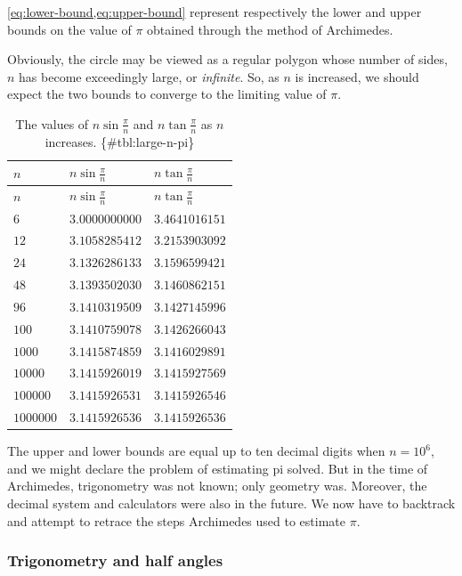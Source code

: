 \documentclass[
  a4paper,
]{article}
\begin{document}
\cref{eq:lower-bound,eq:upper-bound} represent respectively the lower
and upper bounds on the value of \(\pi\) obtained through the method of
Archimedes.

Obviously, the circle may be viewed as a regular polygon whose number of
sides, \(n\) has become exceedingly large, or \emph{infinite}. So, as
\(n\) is increased, we should expect the two bounds to converge to the
limiting value of \(\pi\).

\begin{longtable}[]{@{}lll@{}}
\caption{The values of \(n\sin\frac{\pi}{n}\) and \(n\tan\frac{\pi}{n}\)
as \(n\) increases. \{\#tbl:large-n-pi\}\\
}\tabularnewline
\toprule\noalign{}
\(n\) & \(n\sin\frac{\pi}{n}\) & \(n\tan\frac{\pi}{n}\) \\
\midrule\noalign{}
\endfirsthead
\toprule\noalign{}
\(n\) & \(n\sin\frac{\pi}{n}\) & \(n\tan\frac{\pi}{n}\) \\
\midrule\noalign{}
\endhead
\bottomrule\noalign{}
\endlastfoot
\(6\) & \(3.0000000000\) & \(3.4641016151\) \\
\(12\) & \(3.1058285412\) & \(3.2153903092\) \\
\(24\) & \(3.1326286133\) & \(3.1596599421\) \\
\(48\) & \(3.1393502030\) & \(3.1460862151\) \\
\(96\) & \(3.1410319509\) & \(3.1427145996\) \\
\(100\) & \(3.1410759078\) & \(3.1426266043\) \\
\(1000\) & \(3.1415874859\) & \(3.1416029891\) \\
\(10000\) & \(3.1415926019\) & \(3.1415927569\) \\
\(100000\) & \(3.1415926531\) & \(3.1415926546\) \\
\(1000000\) & \(3.1415926536\) & \(3.1415926536\) \\
\end{longtable}

The upper and lower bounds are equal up to ten decimal digits when
\(n = 10^{6}\), and we might declare the problem of estimating pi
solved. But in the time of Archimedes, trigonometry was not known; only
geometry was. Moreover, the decimal system and calculators were also in
the future. We now have to backtrack and attempt to retrace the steps
Archimedes used to estimate \(\pi\).

\subsubsection{Trigonometry and half
angles}\label{trigonometry-and-half-angles}
\end{document}
